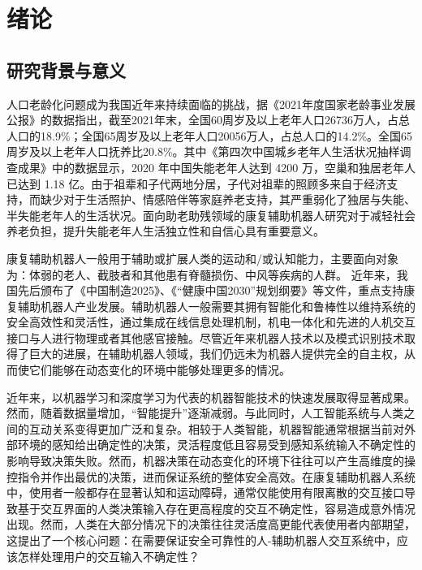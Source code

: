 
\chapter{绪论}

\section{研究背景与意义}
人口老龄化问题成为我国近年来持续面临的挑战，据《2021年度国家老龄事业发展公报》\cite{2021NianDuGuoJiaLaoLingShiYeFaZhanGongBao}的数据指出，截至2021年末，全国60周岁及以上老年人口26736万人，占总人口的18.9\%；全国65周岁及以上老年人口20056万人，占总人口的14.2\%。全国65周岁及以上老年人口抚养比20.8\%。其中《第四次中国城乡老年人生活状况抽样调查成果》中的数据显示，2020 年中国失能老年人达到 4200 万，空巢和独居老年人已达到 1.18 亿。由于祖辈和子代两地分居，子代对祖辈的照顾多来自于经济支持，而缺少对于生活照护、情感陪伴等家庭养老支持，其严重弱化了独居与失能、半失能老年人的生活状况。面向助老助残领域的康复辅助机器人研究对于减轻社会养老负担，提升失能老年人生活独立性和自信心具有重要意义。

康复辅助机器人一般用于辅助或扩展人类的运动和/或认知能力，主要面向对象为：体弱的老人、截肢者和其他患有脊髓损伤、中风等疾病的人群。 近年来，我国先后颁布了《中国制造2025》、《“健康中国2030”规划纲要》等文件，重点支持康复辅助机器人产业发展。辅助机器人一般需要其拥有智能化和鲁棒性以维持系统的安全高效性和灵活性，通过集成在线信息处理机制，机电一体化和先进的人机交互接口与人进行物理或者其他感官接触。尽管近年来机器人技术以及模式识别技术取得了巨大的进展，在辅助机器人领域，我们仍远未为机器人提供完全的自主权，从而使它们能够在动态变化的环境中能够处理更多的情况。

近年来，以机器学习和深度学习为代表的机器智能技术的快速发展取得显著成果。然而，随着数据量增加，``智能提升''逐渐减弱。与此同时，人工智能系统与人类之间的互动关系变得更加广泛和复杂。相较于人类智能，机器智能通常根据当前对外部环境的感知给出确定性的决策，灵活程度低且容易受到感知系统输入不确定性的影响导致决策失败。然而，机器决策在动态变化的环境下往往可以产生高维度的操控指令并作出最优的决策，进而保证系统的整体安全高效。在康复辅助机器人系统中，使用者一般都存在显著认知和运动障碍，通常仅能使用有限离散的交互接口导致基于交互界面的人类决策输入存在更高程度的交互不确定性，容易造成意外情况出现。然而，人类在大部分情况下的决策往往灵活度高更能代表使用者内部期望，这提出了一个核心问题：在需要保证安全可靠性的人-辅助机器人交互系统中，应该怎样处理用户的交互输入不确定性？





